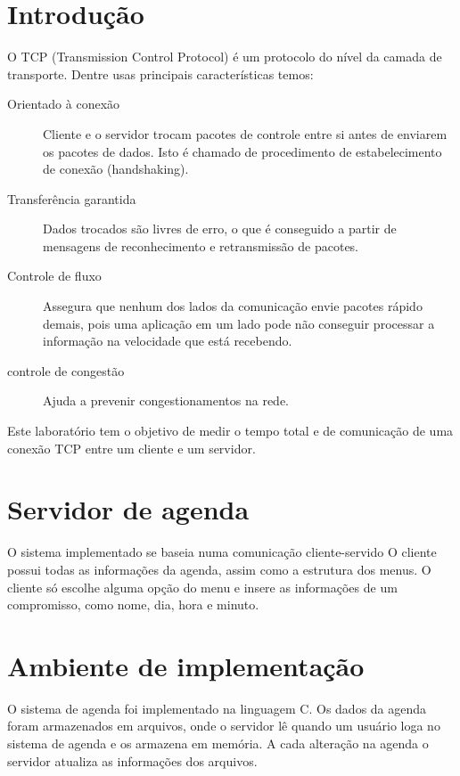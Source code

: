\documentclass[10pt,a4paper]{article}
\begin{document}
\section{Introdução}
O TCP (Transmission Control Protocol) é um protocolo do nível da
camada de transporte. Dentre usas principais características temos:
\begin{description}
\item[Orientado à conexão]  Cliente e o servidor trocam pacotes de
controle entre si antes de enviarem os pacotes de dados. Isto é chamado de procedimento de
estabelecimento de conexão (handshaking). 
\item[Transferência garantida] Dados trocados são livres de erro, o que é conseguido a partir de
mensagens de reconhecimento e retransmissão de pacotes. 
\item[Controle de fluxo] Assegura que nenhum dos lados da comunicação envie pacotes rápido demais, pois uma aplicação em um
lado pode não conseguir processar a informação na velocidade que está
recebendo.
\item[controle de congestão] Ajuda a prevenir congestionamentos na rede.


\end{description}


  Este laboratório tem o objetivo de medir o tempo total e de comunicação de uma conexão TCP entre um cliente e um servidor.

\section{Servidor de agenda}
  O sistema implementado se baseia numa comunicação cliente-servido O cliente possui todas as informações da agenda, assim como a estrutura dos menus. O cliente só escolhe alguma opção do menu e insere as informações de um compromisso, como nome, dia, hora e minuto.

\section{Ambiente de implementação}
  O sistema de agenda foi implementado na linguagem C. Os dados da agenda foram armazenados em arquivos, onde o servidor lê quando um usuário loga no sistema de agenda e os armazena em memória. A cada alteração na agenda o servidor atualiza as informações dos arquivos.
\end{document}
